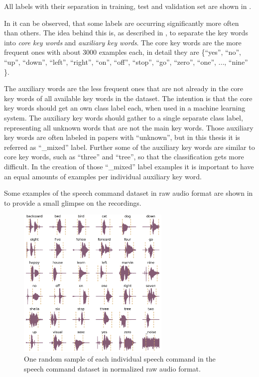 

All labels with their separation in training, test and validation set are shown in .


In  it can be observed, that some labels are occurring significantly more often than others.
The idea behind this is, as described in \cite{Warden2018}, to separate the key words into \emph{core key words} and \emph{auxiliary key words}.
The core key words are the more frequent ones with about 3000 examples each, in detail they are \{\enquote{yes}, \enquote{no}, \enquote{up}, \enquote{down}, \enquote{left}, \enquote{right}, \enquote{on}, \enquote{off}, \enquote{stop}, \enquote{go}, \enquote{zero}, \enquote{one}, ..., \enquote{nine} \}.

The auxiliary words are the less frequent ones that are not already in the core key words of all available key words in the dataset.
The intention is that the core key words should get an own class label each, when used in a machine learning system. 
The auxiliary key words should gather to a single separate class label, representing all unknown words that are not the main key words.
Those auxiliary key words are often labeled in papers with \enquote{unknown}, but in this thesis it is referred as \enquote{\_mixed} label.
Further some of the auxiliary key words are similar to core key words, such as \enquote{three} and \enquote{tree}, so that the classification gets more difficult.
In the creation of those \enquote{\_mixed} label examples it is important to have an equal amounts of examples per individual auxiliary key word. 

Some examples of the speech command dataset in raw audio format are shown in  to provide a small glimpse on the recordings.
\begin{figure}[!ht]
  \centering
    \includegraphics[width=0.65\textwidth]{./5_exp/figs/exp_dataset_wav_grid_speech_commands_v2}
  \caption{One random sample of each individual speech command in the speech command dataset in normalized raw audio format.}
  \label{fig:exp_dataset_wav_grid_speech_commands_v2}
\end{figure}
\FloatBarrier
\noindent

